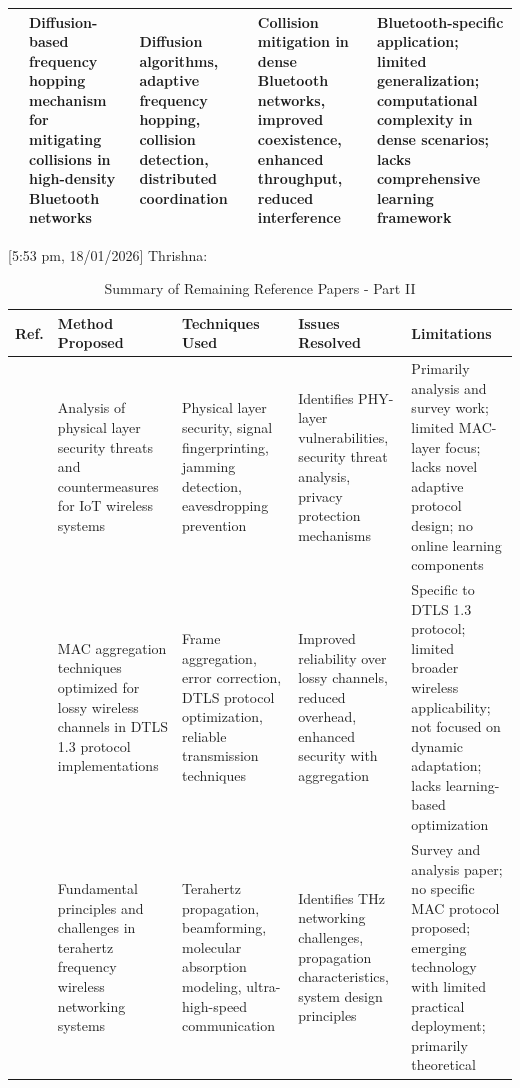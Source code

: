 \documentclass[a4paper,fleqn]{cas-dc}
\numberwithin{equation}{section}
\begin{document}
\begin{table}[htbp]
\begin{tabular}{|L{0.8cm}|L{3.2cm}|L{2.8cm}|L{3cm}|L{3.5cm}|}
{\cite{Yang2025}} & Diffusion-based frequency hopping mechanism for mitigating collisions in high-density Bluetooth networks & Diffusion algorithms, adaptive frequency hopping, collision detection, distributed coordination & Collision mitigation in dense Bluetooth networks, improved coexistence, enhanced throughput, reduced interference & Bluetooth-specific application; limited generalization; computational complexity in dense scenarios; lacks comprehensive learning framework \\
\hline

\end{tabular}
\end{table}
[5:53 pm, 18/01/2026] Thrishna: \begin{table}[htbp]
\centering
\caption{Summary of Remaining Reference Papers - Part II}
\label{tab:remaining_papers_2}
\small
\begin{tabular}{|L{0.8cm}|L{3.2cm}|L{2.8cm}|L{3cm}|L{3.5cm}|}
\hline
\textbf{Ref.} & \textbf{Method Proposed} & \textbf{Techniques Used} & \textbf{Issues Resolved} & \textbf{Limitations} \\
\hline

{\cite{LoCigno2025}} & Analysis of physical layer security threats and countermeasures for IoT wireless systems & Physical layer security, signal fingerprinting, jamming detection, eavesdropping prevention & Identifies PHY-layer vulnerabilities, security threat analysis, privacy protection mechanisms & Primarily analysis and survey work; limited MAC-layer focus; lacks novel adaptive protocol design; no online learning components \\
\hline

{\cite{Wagner2025}} & MAC aggregation techniques optimized for lossy wireless channels in DTLS 1.3 protocol implementations & Frame aggregation, error correction, DTLS protocol optimization, reliable transmission techniques & Improved reliability over lossy channels, reduced overhead, enhanced security with aggregation & Specific to DTLS 1.3 protocol; limited broader wireless applicability; not focused on dynamic adaptation; lacks learning-based optimization \\
\hline

{\cite{Sammaiah2025235}} & Fundamental principles and challenges in terahertz frequency wireless networking systems & Terahertz propagation, beamforming, molecular absorption modeling, ultra-high-speed communication & Identifies THz networking challenges, propagation characteristics, system design principles & Survey and analysis paper; no specific MAC protocol proposed; emerging technology with limited practical deployment; primarily theoretical \\
\hline


\end{tabular}
\end{table}
\end{document}
